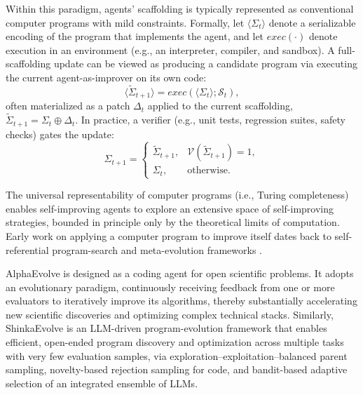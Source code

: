 Within this paradigm, agents' scaffolding is typically represented as conventional computer programs with mild constraints. {Formally,} let $\langle \Sigma_t \rangle$ denote a serializable encoding of the program that implements the agent, and let $exec(\cdot)$ denote execution in an environment (e.g., an interpreter, compiler, and sandbox).
A full-scaffolding update can be viewed as producing a candidate program via executing the current agent-as-improver on its own code:
\begin{equation}
\langle \tilde{\Sigma}_{t+1} \rangle = exec(\langle \Sigma_t \rangle;\mathcal{S}_t),
\end{equation}
often materialized as a patch $\Delta_t$ applied to the current scaffolding,
$\tilde{\Sigma}_{t+1} = \Sigma_t \oplus \Delta_t$.
In practice, a verifier (e.g., unit tests, regression suites, safety checks) gates the update:
\begin{equation}
\Sigma_{t+1}=
\begin{cases}
\tilde{\Sigma}_{t+1}, & \mathcal{V}(\tilde{\Sigma}_{t+1})=1,\\
\Sigma_t, & \text{otherwise}.
\end{cases}
\end{equation}

The universal representability of computer programs (i.e., Turing completeness) enables self-improving agents to explore an extensive space of self-improving strategies, bounded in principle only by the theoretical limits of computation. Early work on applying a computer program to improve itself dates back to self-referential program-search and meta-evolution frameworks \citep{schmidhuber1987selfreferential}.

AlphaEvolve \citep{novikov2025alphaevolvecodingagentscientific} is designed as a coding agent for open scientific problems. It adopts an evolutionary paradigm, continuously receiving feedback from one or more evaluators to iteratively improve its algorithms, thereby substantially accelerating new scientific discoveries and optimizing complex technical stacks. Similarly, ShinkaEvolve \citep{lange2025shinkaevolveopenendedsampleefficientprogram} is an LLM-driven program-evolution framework that enables efficient, open-ended program discovery and optimization across multiple tasks with very few evaluation samples, via exploration–exploitation–balanced parent sampling, novelty-based rejection sampling for code, and bandit-based adaptive selection of an integrated ensemble of LLMs.

